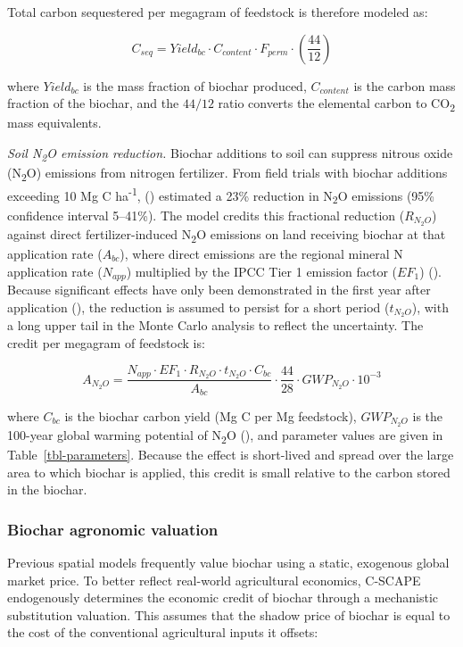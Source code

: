 \documentclass[
  letterpaper,
]{article}
\begin{document}
Total carbon sequestered per megagram of feedstock is therefore modeled
as:

\[C_{seq} = Yield_{bc} \cdot C_{content} \cdot F_{perm} \cdot \left(\frac{44}{12}\right)\]

where \(Yield_{bc}\) is the mass fraction of biochar produced,
\(C_{content}\) is the carbon mass fraction of the biochar, and the
\(44/12\) ratio converts the elemental carbon to CO\textsubscript{2}
mass equivalents.

\emph{Soil N\textsubscript{2}O emission reduction.} Biochar additions to
soil can suppress nitrous oxide (N\textsubscript{2}O) emissions from
nitrogen fertilizer. From field trials with biochar additions exceeding
10 Mg C ha\textsuperscript{-1},
() estimated a 23\%
reduction in N\textsubscript{2}O emissions (95\% confidence interval
5--41\%). The model credits this fractional reduction (\(R_{N_2O}\))
against direct fertilizer-induced N\textsubscript{2}O emissions on land
receiving biochar at that application rate (\(A_{bc}\)), where direct
emissions are the regional mineral N application rate (\(N_{app}\))
multiplied by the IPCC Tier 1 emission factor (\(EF_1\))
(). Because significant effects have
only been demonstrated in the first year after application
(), the reduction is
assumed to persist for a short period (\(t_{N_2O}\)), with a long upper
tail in the Monte Carlo analysis to reflect the uncertainty. The credit
per megagram of feedstock is:

\[A_{N_2O} = \frac{N_{app} \cdot EF_1 \cdot R_{N_2O} \cdot t_{N_2O} \cdot C_{bc}}{A_{bc}} \cdot \frac{44}{28} \cdot GWP_{N_2O} \cdot 10^{-3}\]

where \(C_{bc}\) is the biochar carbon yield (Mg C per Mg feedstock),
\(GWP_{N_2O}\) is the 100-year global warming potential of
N\textsubscript{2}O (), and
parameter values are given in Table~\ref{tbl-parameters}. Because the
effect is short-lived and spread over the large area to which biochar is
applied, this credit is small relative to the carbon stored in the
biochar.

\subsubsection{Biochar agronomic
valuation}\label{biochar-agronomic-valuation}

Previous spatial models frequently value biochar using a static,
exogenous global market price. To better reflect real-world agricultural
economics, C-SCAPE endogenously determines the economic credit of
biochar through a mechanistic substitution valuation. This assumes that
the shadow price of biochar is equal to the cost of the conventional
agricultural inputs it offsets:
\end{document}
